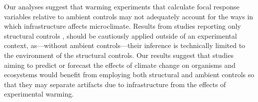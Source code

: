\documentclass{article}
\begin{document}
\par Our analyses suggest that warming experiments that calculate focal response variables relative to ambient controls \citep[e.g.,][]{price1998,dunne2003,cleland2006,morin2010,marchin2015} may not adequately account for the ways in which infrastructure affects microclimate. Results from studies reporting only structural controls \citep [e.g.,][]{sherry2007,hoeppner2012, rollinson2012}, should be cautiously applied outside of an experimental context, as---without ambient controls---their inference is technically limited to the environment of the structural controls. Our results suggest that studies aiming to predict or forecast the effects of climate change on organisms and ecosystems would benefit from employing both structural and ambient controls so that they may separate artifacts due to infrastructure from the effects of experimental warming. 
\end{document}
